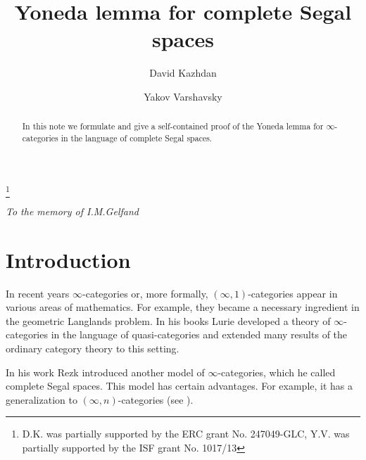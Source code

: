 \documentclass[12pt]{amsart}
\theoremstyle{plain}
\theoremstyle{definition}
\numberwithin{equation}{section}
\begin{document}

\title[Yoneda lemma for complete Segal spaces]%
{Yoneda lemma for complete Segal spaces}

\author{David Kazhdan}
\author{Yakov Varshavsky}
\address{Institute of Mathematics\\
The Hebrew University of Jerusalem\\
Givat-Ram, Jerusalem,  91904\\
Israel} 



\thanks{D.K. was partially supported by the ERC grant No. 247049-GLC,
Y.V. was partially supported by the ISF grant No. 1017/13}
\begin{abstract} In this note we formulate and give a self-contained proof of
the Yoneda lemma for $\infty$-categories in the language of
complete Segal spaces.
\end{abstract}
\maketitle \centerline{\em To the memory of I.M.Gelfand}

\newpage
\tableofcontents
\newpage

\section*{Introduction}
In recent years $\infty$-categories or, more formally,
$(\infty,1)$-categories appear in various areas of mathematics.
For example, they became a necessary ingredient in the geometric
Langlands problem.  In his books \cite{Lu,Lu2} Lurie developed a
theory of $\infty$-categories in the language of quasi-categories
and extended many results of the ordinary category theory to this
setting.

In his work \cite{Re} Rezk introduced another model of
$\infty$-categories, which he called complete Segal spaces. This
model has certain advantages. For example, it has a 
generalization to $(\infty,n)$-categories (see \cite{Re2}).
\end{document}
